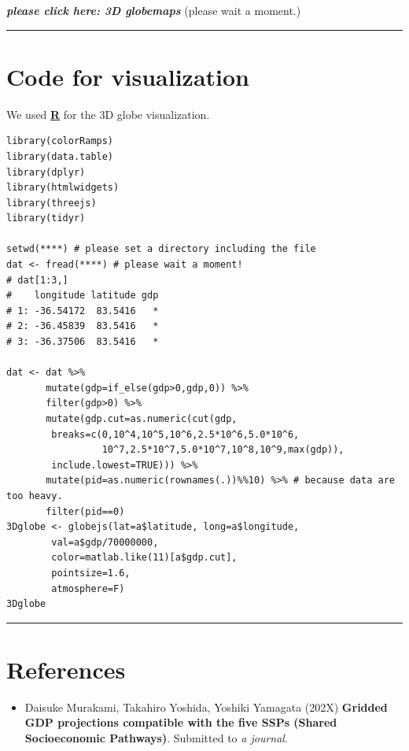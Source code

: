 \documentclass[]{book}
\providecommand{\tightlist}{%
  \setlength{\itemsep}{0pt}\setlength{\parskip}{0pt}}
\begin{document}
\textbf{\emph{please click here: 3D globemaps}} (please wait a moment.)

\begin{center}\rule{0.5\linewidth}{\linethickness}\end{center}

\hypertarget{code-for-visualization}{%
\section*{Code for visualization}\label{code-for-visualization}}

We used \href{https://www.r-project.org/}{\textbf{R}} for the 3D globe visualization.

\begin{verbatim}
library(colorRamps)
library(data.table)
library(dplyr)
library(htmlwidgets)
library(threejs)
library(tidyr)

setwd(****) # please set a directory including the file
dat <- fread(****) # please wait a moment!
# dat[1:3,]
#    longitude latitude gdp
# 1: -36.54172  83.5416   *
# 2: -36.45839  83.5416   *
# 3: -36.37506  83.5416   *

dat <- dat %>%
       mutate(gdp=if_else(gdp>0,gdp,0)) %>%
       filter(gdp>0) %>%
       mutate(gdp.cut=as.numeric(cut(gdp,
        breaks=c(0,10^4,10^5,10^6,2.5*10^6,5.0*10^6,
                 10^7,2.5*10^7,5.0*10^7,10^8,10^9,max(gdp)), 
        include.lowest=TRUE))) %>%
       mutate(pid=as.numeric(rownames(.))%%10) %>% # because data are too heavy.
       filter(pid==0)
3Dglobe <- globejs(lat=a$latitude, long=a$longitude,
        val=a$gdp/70000000,
        color=matlab.like(11)[a$gdp.cut],
        pointsize=1.6,
        atmosphere=F)
3Dglobe        
\end{verbatim}

\begin{center}\rule{0.5\linewidth}{\linethickness}\end{center}

\hypertarget{references}{%
\section*{References}\label{references}}

\begin{itemize}
\tightlist
\item
  Daisuke Murakami, Takahiro Yoshida, Yoshiki Yamagata (202X) \textbf{Gridded GDP projections compatible with the five SSPs (Shared Socioeconomic Pathways)}. Submitted to \emph{a journal}.
\end{itemize}


\end{document}
